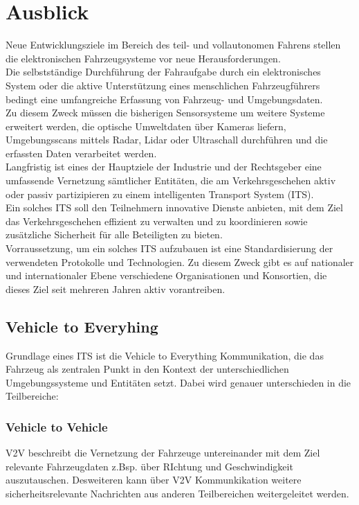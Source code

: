 \section{Ausblick}

    Neue Entwicklungsziele im Bereich des teil- und vollautonomen Fahrens stellen die elektronischen Fahrzeugsysteme vor neue Herausforderungen.\\
    Die selbstständige Durchführung der Fahraufgabe durch ein elektronisches System oder die aktive Unterstützung eines menschlichen Fahrzeugführers
    bedingt eine umfangreiche Erfassung von Fahrzeug- und Umgebungsdaten.\\
    Zu diesem Zweck müssen die bisherigen Sensorsysteme um weitere Systeme erweitert werden, die optische Umweltdaten über Kameras liefern, Umgebungsscans
    mittels Radar, Lidar oder Ultraschall durchführen und die erfassten Daten verarbeitet werden. ~\cite{.BP06}\\

    Langfristig ist eines der Hauptziele der Industrie und der Rechtsgeber eine umfassende Vernetzung
    sämtlicher Entitäten, die am Verkehrsgeschehen aktiv oder passiv partizipieren zu einem intelligenten
    Transport System (ITS).\\
    Ein solches ITS soll den Teilnehmern innovative Dienste anbieten, mit dem Ziel das Verkehrsgeschehen
    effizient zu verwalten und zu koordinieren sowie zusätzliche Sicherheit für alle Beteiligten zu bieten. ~\cite{.BP04}\\

    Vorraussetzung, um ein solches ITS aufzubauen ist eine Standardisierung der verwendeten Protokolle und Technologien.
    Zu diesem Zweck gibt es auf nationaler und internationaler Ebene verschiedene Organisationen und Konsortien,
    die dieses Ziel seit mehreren Jahren aktiv vorantreiben.\\

    \subsection{Vehicle to Everyhing}
    Grundlage eines ITS ist die Vehicle to Everything Kommunikation, die das Fahrzeug als zentralen Punkt in den
    Kontext der unterschiedlichen Umgebungssysteme und Entitäten setzt. Dabei wird genauer unterschieden in die Teilbereiche:
    
    \subsubsection{Vehicle to Vehicle}
    V2V beschreibt die Vernetzung der Fahrzeuge untereinander mit dem Ziel relevante Fahrzeugdaten z.Bsp. über RIchtung und Geschwindigkeit auszutauschen.
    Desweiteren kann über V2V Kommunkikation weitere sicherheitsrelevante Nachrichten aus anderen Teilbereichen weitergeleitet werden.

